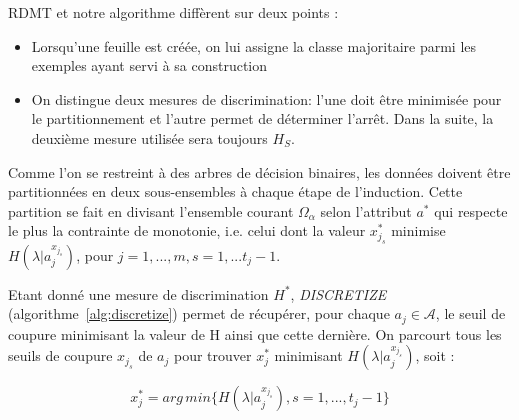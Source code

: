 \documentclass[a4paper]{article}
\begin{document}
RDMT et notre algorithme diffèrent sur deux points :
\begin{itemize}
    \item Lorsqu'une feuille est créée, on lui assigne la classe majoritaire parmi les exemples ayant servi à sa
construction
    \item On distingue deux mesures de discrimination: l'une doit
être minimisée pour le partitionnement et l'autre permet de déterminer l'arrêt. Dans la suite, la deuxième mesure utilisée sera toujours $H_S$.
\end{itemize}

Comme l'on se restreint à des arbres de décision binaires, les données doivent
être partitionnées en deux sous-ensembles à chaque étape de l'induction. Cette
partition se fait en divisant l'ensemble courant $\Omega_{\alpha}$ selon
l'attribut $a^*$ qui respecte le plus la contrainte de monotonie, i.e. celui
dont la valeur $x^*_{j_s}$ minimise $H(\lambda|a^{x_{j_s}}_j)$, pour $j=1,...,m,
s=1,...t_j-1$. 

Etant donné une mesure de discrimination $H^*$, \textit{DISCRETIZE}
(algorithme~\ref{alg:discretize}) permet de récupérer, pour chaque $a_j \in
\mathcal{A}$, le seuil de coupure minimisant la valeur de H ainsi que cette
dernière. On parcourt tous les seuils de coupure $x_{j_s}$ de $a_j$
pour trouver $x^*_{j}$ minimisant $H(\lambda|a^{x_{j_s}}_j)$, soit :

$$ x^*_{j} = arg\,min \{H(\lambda|a^{x_{j_s}}_j), s=1,...,t_j -1\}$$
\end{document}
